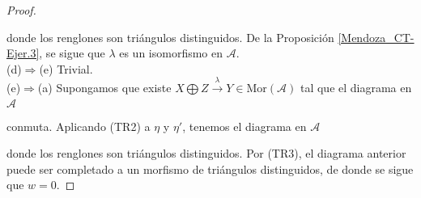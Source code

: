 \documentclass[tesis]{subfiles}
\begin{document}
\begin{proof}
\begin{center}
    \end{center}
    donde los renglones son triángulos distinguidos. De la Proposición \ref{Mendoza_CT-Ejer.3}, se sigue que $\lambda$ es un isomorfismo en $\mathscr{A}$. \\

    (d)$\Rightarrow$(e) Trivial. \\

    (e)$\Rightarrow$(a) Supongamos que existe $X\bigoplus Z\xrightarrow[]{\lambda}Y\in\text{Mor}(\mathscr{A})$ tal que el diagrama en $\mathscr{A}$
            \begin{center}
           \end{center}
           conmuta. Aplicando (TR2) a $\eta$ y $\eta'$, tenemos el diagrama en $\mathscr{A}$
    \begin{center}
    \end{center}
    donde los renglones son triángulos distinguidos. Por (TR3), el diagrama anterior puede ser completado a un morfismo de triángulos distinguidos, de donde se sigue que $w=0$.
\end{proof}
\end{document}
